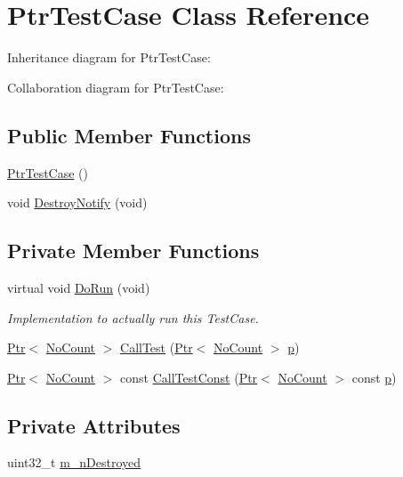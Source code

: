\hypertarget{classPtrTestCase}{}\section{Ptr\+Test\+Case Class Reference}
\label{classPtrTestCase}


Inheritance diagram for Ptr\+Test\+Case\+:


Collaboration diagram for Ptr\+Test\+Case\+:
\subsection*{Public Member Functions}
\begin{DoxyCompactItemize}
\item 
\hyperlink{classPtrTestCase_ac27ce0836056ea1872f00b3870894ebd}{Ptr\+Test\+Case} ()
\item 
void \hyperlink{classPtrTestCase_a194ceb73f780d9d92ac8b3c96c7938db}{Destroy\+Notify} (void)
\end{DoxyCompactItemize}
\subsection*{Private Member Functions}
\begin{DoxyCompactItemize}
\item 
virtual void \hyperlink{classPtrTestCase_a1057f897710bdbbfebc73cc8c855aaa4}{Do\+Run} (void)
\begin{DoxyCompactList}\small\item\em Implementation to actually run this Test\+Case. \end{DoxyCompactList}\item 
\hyperlink{classns3_1_1Ptr}{Ptr}$<$ \hyperlink{classNoCount}{No\+Count} $>$ \hyperlink{classPtrTestCase_a5a8f1774dc4f729c4db20ce128fb3e66}{Call\+Test} (\hyperlink{classns3_1_1Ptr}{Ptr}$<$ \hyperlink{classNoCount}{No\+Count} $>$ \hyperlink{lte__link__budget__x2__handover__measures_8m_ac9de518908a968428863f829398a4e62}{p})
\item 
\hyperlink{classns3_1_1Ptr}{Ptr}$<$ \hyperlink{classNoCount}{No\+Count} $>$ const \hyperlink{classPtrTestCase_a8fb2196446c71e43fba045cf2a5f4ff7}{Call\+Test\+Const} (\hyperlink{classns3_1_1Ptr}{Ptr}$<$ \hyperlink{classNoCount}{No\+Count} $>$ const \hyperlink{lte__link__budget__x2__handover__measures_8m_ac9de518908a968428863f829398a4e62}{p})
\end{DoxyCompactItemize}
\subsection*{Private Attributes}
\begin{DoxyCompactItemize}
\item 
uint32\+\_\+t \hyperlink{classPtrTestCase_a189fef4a0d0e348de7554be35da17977}{m\+\_\+n\+Destroyed}
\end{DoxyCompactItemize}
